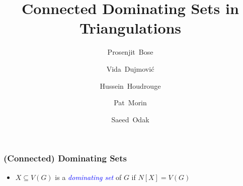 \documentclass{beamer}
\title{Connected Dominating Sets in Triangulations}
\author{}
\author{%
  Prosenjit~Bose \and
  Vida~Dujmović \and
  Hussein~Houdrouge \and
  Pat~Morin \and
  Saeed~Odak}
\date{}
\newcommand{\emphh}[1]{\textcolor{blue}{\emph{#1}}}
\begin{document}
\begin{frame}
    \maketitle
\end{frame}


\begin{frame}
  \frametitle{(Connected) Dominating Sets}

  \begin{itemize}
    \item $X\subseteq V(G)$ is a \emphh{dominating set} of $G$ if $N[X]=V(G)$
    \begin{center}

\end{center}
\end{itemize}
\end{frame}
\end{document}
